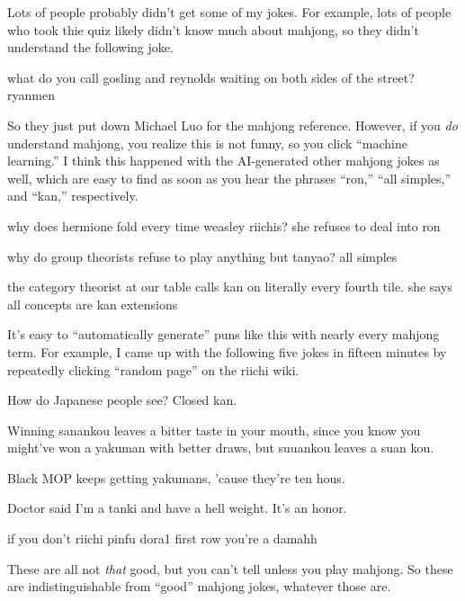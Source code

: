 \documentclass[11pt]{scrartcl}
\begin{document}
Lots of people probably didn't get some of my jokes. For example, lots of people who took thie quiz likely didn't know much about mahjong, so they didn't understand the following joke.
\begin{joke}
    what do you call gosling and reynolds waiting on both sides of the street? ryanmen
\end{joke}
So they just put down Michael Luo for the mahjong reference. However, if you \emph{do} understand mahjong, you realize this is not funny, so you click ``machine learning.'' I think this happened with the AI-generated other mahjong jokes as well, which are easy to find as soon as you hear the phrases ``ron,'' ``all simples,'' and ``kan,'' respectively.
\begin{joke}
    why does hermione fold every time weasley riichis? she refuses to deal into ron
\end{joke}
\begin{joke}
    why do group theorists refuse to play anything but tanyao? all simples
\end{joke}
\begin{joke}
    the category theorist at our table calls kan on literally every fourth tile. she says all concepts are kan extensions
\end{joke}
It's easy to ``automatically generate'' puns like this with nearly every mahjong term. For example, I came up with the following five jokes in fifteen minutes by repeatedly clicking ``random page'' on the riichi wiki.
\begin{joke}
    How do Japanese people see? Closed kan.
\end{joke}
\begin{joke}
    Winning sanankou leaves a bitter taste in your mouth, since you know you might've won a yakuman with better draws, but suuankou leaves a suan kou.
\end{joke}
\begin{joke}
    Black MOP keeps getting yakumans, 'cause they're ten hous.
\end{joke}
\begin{joke}
    Doctor said I'm a tanki and have a hell weight. It's an honor.
\end{joke}
\begin{joke}
    if you don't riichi pinfu dora1 first row you're a damahh
\end{joke}
These are all not \emph{that} good, but you can't tell unless you play mahjong. So these are indistinguishable from ``good'' mahjong jokes, whatever those are.
\end{document}
